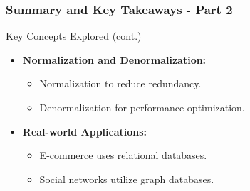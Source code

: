 \documentclass[aspectratio=169]{beamer}
\begin{document}
\begin{frame}[fragile]
    \frametitle{Summary and Key Takeaways - Part 2}
    \begin{block}{Key Concepts Explored (cont.)}
        \begin{itemize}
            \item \textbf{Normalization and Denormalization:}
            \begin{itemize}
                \item Normalization to reduce redundancy.
                \item Denormalization for performance optimization.
            \end{itemize}
            \item \textbf{Real-world Applications:}
            \begin{itemize}
                \item E-commerce uses relational databases.
                \item Social networks utilize graph databases.
            \end{itemize}
        \end{itemize}
    \end{block}
\end{frame}
\end{document}
